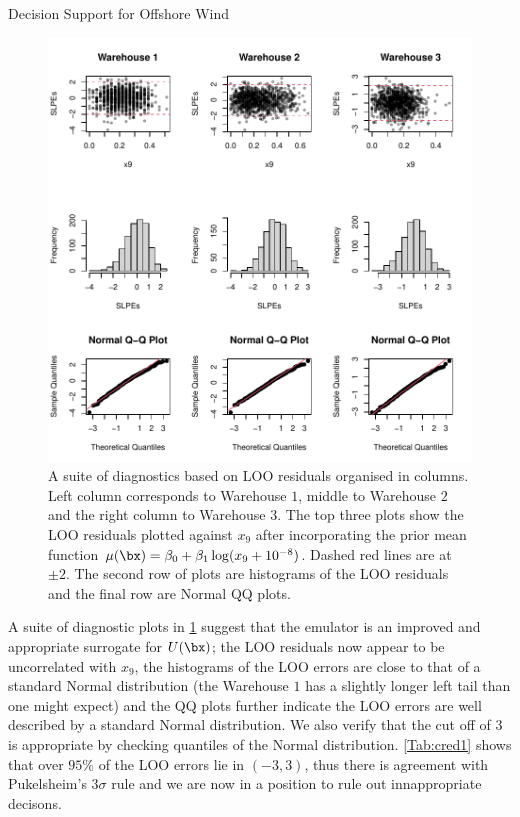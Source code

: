 \begin{chapter}{Decision Support for Offshore Wind \label{Ch:ds-for-ow}}
\begin{figure}
  \centering
  \includegraphics{fig-ds/second-resids.pdf}
  \caption{A suite of diagnostics based on LOO residuals organised in columns. Left column corresponds to Warehouse $1$,  middle to Warehouse $2$ and the right column to Warehouse $3$. The top three plots show the LOO residuals plotted against $x_9$ after incorporating the prior mean function $\mu(\bx) = \beta_0 + \beta_1 \log (x_9 + 10^{-8})$. Dashed red lines are at $\pm2$. The second row of plots are histograms of the LOO residuals and the final row are Normal QQ plots.\label{Fig:second-loo}}
\end{figure}
  A suite of diagnostic plots in \cref{Fig:second-loo} suggest that the emulator is an improved and appropriate surrogate for $U(\bx)$; the LOO residuals now appear to be uncorrelated with $x_9$, the histograms of the LOO errors are close to that of a standard Normal distribution (the Warehouse $1$ has a slightly longer left tail than one might expect) and the QQ plots further indicate the LOO errors are well described by a standard Normal distribution. We also verify that the cut off of $3$ is appropriate by checking quantiles of the Normal distribution. \cref{Tab:cred1} shows that over $95\%$ of the LOO errors lie in $(-3,3)$, thus there is agreement with Pukelsheim's $3\sigma$ rule and we are now in a position to rule out innappropriate decisons.

\end{chapter}
